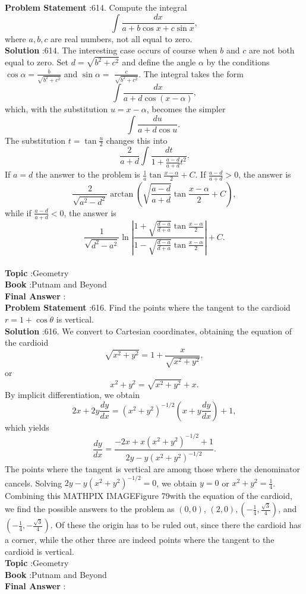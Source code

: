 \documentclass[10pt]{article}
\begin{document}
\textbf{Problem Statement} :614. Compute the integral$$ \int \frac{d x}{a+b \cos x+c \sin x}, $$where $a, b, c$ are real numbers, not all equal to zero.\\
\textbf{Solution} :614. The interesting case occurs of course when $b$ and $c$ are not both equal to zero. Set $d=\sqrt{b^{2}+c^{2}}$ and define the angle $\alpha$ by the conditions $\cos \alpha=\frac{b}{\sqrt{b^{2}+c^{2}}}$ and $\sin \alpha=$ $\frac{c}{\sqrt{b^{2}+c^{2}}}$. The integral takes the form$$ \int \frac{d x}{a+d \cos (x-\alpha)}, $$which, with the substitution $u=x-\alpha$, becomes the simpler$$ \int \frac{d u}{a+d \cos u} \text {. } $$The substitution $t=\tan \frac{u}{2}$ changes this into$$ \frac{2}{a+d} \int \frac{d t}{1+\frac{a-d}{a+d} t^{2}} . $$If $a=d$ the answer to the problem is $\frac{1}{a} \tan \frac{x-\alpha}{2}+C$. If $\frac{a-d}{a+d}>0$, the answer is$$ \frac{2}{\sqrt{a^{2}-d^{2}}} \arctan \left(\sqrt{\frac{a-d}{a+d}} \tan \frac{x-\alpha}{2}+C\right), $$while if $\frac{a-d}{a+d}<0$, the answer is$$ \frac{1}{\sqrt{d^{2}-a^{2}}} \ln \left|\frac{1+\sqrt{\frac{d-a}{d+a}} \tan \frac{x-\alpha}{2}}{1-\sqrt{\frac{d-a}{d+a}} \tan \frac{x-\alpha}{2}}\right|+C . $$\\
\textbf{Topic} :Geometry\\
\textbf{Book} :Putnam and Beyond\\
\textbf{Final Answer} :\\


\textbf{Problem Statement} :616. Find the points where the tangent to the cardioid $r=1+\cos \theta$ is vertical.\\
\textbf{Solution} :616. We convert to Cartesian coordinates, obtaining the equation of the cardioid$$ \sqrt{x^{2}+y^{2}}=1+\frac{x}{\sqrt{x^{2}+y^{2}}}, $$or$$ x^{2}+y^{2}=\sqrt{x^{2}+y^{2}}+x . $$By implicit differentiation, we obtain$$ 2 x+2 y \frac{d y}{d x}=\left(x^{2}+y^{2}\right)^{-1 / 2}\left(x+y \frac{d y}{d x}\right)+1, $$which yields$$ \frac{d y}{d x}=\frac{-2 x+x\left(x^{2}+y^{2}\right)^{-1 / 2}+1}{2 y-y\left(x^{2}+y^{2}\right)^{-1 / 2}} . $$The points where the tangent is vertical are among those where the denominator cancels. Solving $2 y-y\left(x^{2}+y^{2}\right)^{-1 / 2}=0$, we obtain $y=0$ or $x^{2}+y^{2}=\frac{1}{4}$. Combining this MATHPIX IMAGEFigure 79with the equation of the cardioid, we find the possible answers to the problem as $(0,0)$, $(2,0),\left(-\frac{1}{4}, \frac{\sqrt{3}}{4}\right)$, and $\left(-\frac{1}{4},-\frac{\sqrt{3}}{4}\right)$. Of these the origin has to be ruled out, since there the cardioid has a corner, while the other three are indeed points where the tangent to the cardioid is vertical.\\
\textbf{Topic} :Geometry\\
\textbf{Book} :Putnam and Beyond\\
\textbf{Final Answer} :\\
\end{document}
